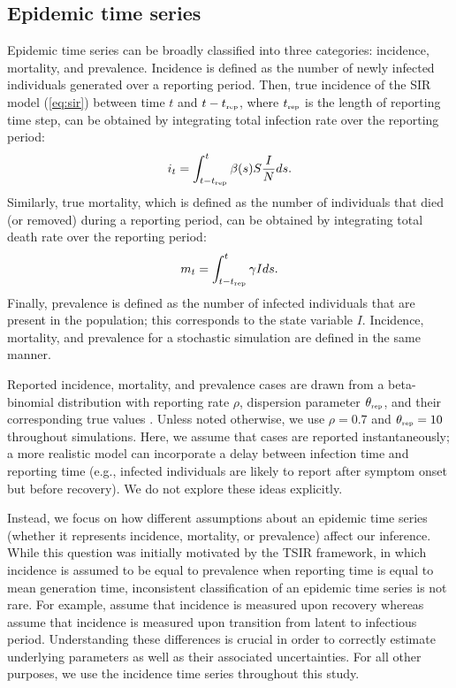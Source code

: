 \documentclass{article}
\newcommand{\eref}[1]{(\ref{eq:#1})}
\newcommand{\tsub}[2]{#1_{{\textrm{\tiny #2}}}}
\begin{document}
\subsection{Epidemic time series}

Epidemic time series can be broadly classified into three categories: incidence, mortality, and prevalence.
Incidence is defined as the number of newly infected individuals generated over a reporting period.
Then, true incidence of the SIR model \eref{sir} between time $t$ and $t-\tsub{t}{rep}$, where $\tsub{t}{rep}$ is the length of reporting time step, can be obtained by integrating total infection rate over the reporting period:
\begin{equation}
i_t = \int_{t-\tsub{t}{rep}}^{t} \beta(s) S \frac{I}{N} ds.
\end{equation}
Similarly, true mortality, which is defined as the number of individuals that died (or removed) during a reporting period, can be obtained by integrating total death rate over the reporting period:
\begin{equation}
m_t = \int_{t-\tsub{t}{rep}}^{t} \gamma I ds.
\end{equation}
Finally, prevalence is defined as the number of infected individuals that are present in the population; 
this corresponds to the state variable $I$. 
Incidence, mortality, and prevalence for a stochastic simulation are defined in the same manner.

Reported incidence, mortality, and prevalence cases are drawn from a beta-binomial distribution with reporting rate $\rho$, dispersion parameter $\tsub{\theta}{rep}$, and their corresponding true values \citep{morris1997disentangling}.
Unless noted otherwise, we use $\rho = 0.7$ and $\tsub{\theta}{rep} = 10$ throughout simulations.
Here, we assume that cases are reported instantaneously; 
a more realistic model can incorporate a delay between infection time and reporting time (e.g., infected individuals are likely to report after symptom onset but before recovery).
We do not explore these ideas explicitly.

Instead, we focus on how different assumptions about an epidemic time series (whether it represents incidence, mortality, or prevalence) affect our inference.
While this question was initially motivated by the TSIR framework, in which incidence is assumed to be equal to prevalence when reporting time is equal to mean generation time, 
inconsistent classification of an epidemic time series is not rare.
For example, \cite{he2009plug} assume that incidence is measured upon recovery whereas \cite{hooker2010parameterizing, althaus2014estimating} assume that incidence is measured upon transition from latent to infectious period.
Understanding these differences is crucial in order to correctly estimate underlying parameters as well as their associated uncertainties.
For all other purposes, we use the incidence time series throughout this study.
\end{document}
